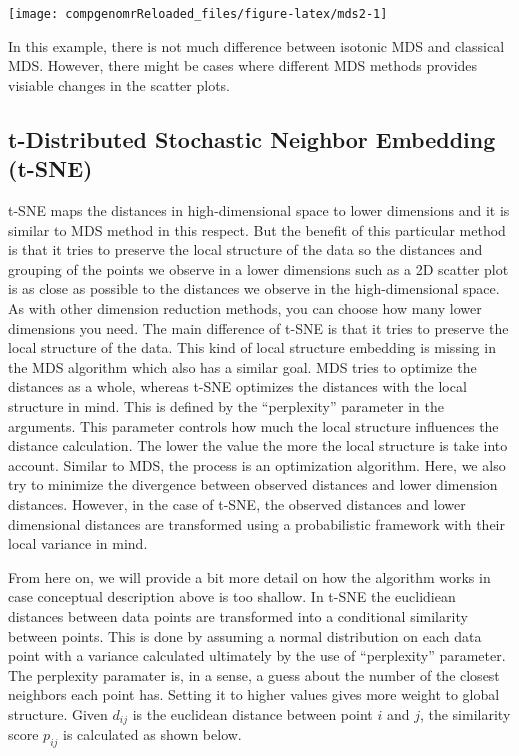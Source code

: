 \documentclass[12pt,]{krantz}
\theoremstyle{definition}
\theoremstyle{definition}
\theoremstyle{definition}
\theoremstyle{remark}
\begin{document}
\begin{center}\texttt{[image: compgenomrReloaded\_files/figure-latex/mds2-1]} \end{center}

In this example, there is not much difference between isotonic MDS and
classical MDS. However, there might be cases where different MDS methods
provides visiable changes in the scatter plots.

\hypertarget{t-distributed-stochastic-neighbor-embedding-t-sne}{%
\subsection{t-Distributed Stochastic Neighbor Embedding
(t-SNE)}\label{t-distributed-stochastic-neighbor-embedding-t-sne}}

t-SNE maps the distances in high-dimensional space to lower dimensions
and it is similar to MDS method in this respect. But the benefit of this
particular method is that it tries to preserve the local structure of
the data so the distances and grouping of the points we observe in a
lower dimensions such as a 2D scatter plot is as close as possible to
the distances we observe in the high-dimensional space. As with other
dimension reduction methods, you can choose how many lower dimensions
you need. The main difference of t-SNE is that it tries to preserve the
local structure of the data. This kind of local structure embedding is
missing in the MDS algorithm which also has a similar goal. MDS tries to
optimize the distances as a whole, whereas t-SNE optimizes the distances
with the local structure in mind. This is defined by the ``perplexity''
parameter in the arguments. This parameter controls how much the local
structure influences the distance calculation. The lower the value the
more the local structure is take into account. Similar to MDS, the
process is an optimization algorithm. Here, we also try to minimize the
divergence between observed distances and lower dimension distances.
However, in the case of t-SNE, the observed distances and lower
dimensional distances are transformed using a probabilistic framework
with their local variance in mind.

From here on, we will provide a bit more detail on how the algorithm
works in case conceptual description above is too shallow. In t-SNE the
euclidiean distances between data points are transformed into a
conditional similarity between points. This is done by assuming a normal
distribution on each data point with a variance calculated ultimately by
the use of ``perplexity'' parameter. The perplexity paramater is, in a
sense, a guess about the number of the closest neighbors each point has.
Setting it to higher values gives more weight to global structure. Given
\(d_{ij}\) is the euclidean distance between point \(i\) and \(j\), the
similarity score \(p_{ij}\) is calculated as shown below.
\end{document}
